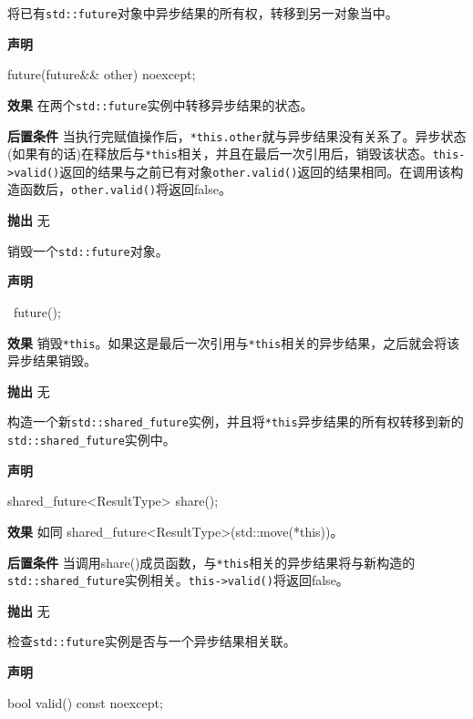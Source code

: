 将已有\texttt{std::future}对象中异步结果的所有权，转移到另一对象当中。

\textbf{声明}

\begin{cpp}
future(future&& other) noexcept;
\end{cpp}

\textbf{效果}
在两个\texttt{std::future}实例中转移异步结果的状态。

\textbf{后置条件}
当执行完赋值操作后，\texttt{*this.other}就与异步结果没有关系了。异步状态(如果有的话)在释放后与\texttt{*this}相关，并且在最后一次引用后，销毁该状态。\texttt{this->valid()}返回的结果与之前已有对象\texttt{other.valid()}返回的结果相同。在调用该构造函数后，\texttt{other.valid()}将返回false。

\textbf{抛出}
无


销毁一个\texttt{std::future}对象。

\textbf{声明}

\begin{cpp}
~future();
\end{cpp}

\textbf{效果}
销毁\texttt{*this}。如果这是最后一次引用与\texttt{*this}相关的异步结果，之后就会将该异步结果销毁。

\textbf{抛出}
无


构造一个新\texttt{std::shared\_future}实例，并且将\texttt{*this}异步结果的所有权转移到新的\texttt{std::shared\_future}实例中。

\textbf{声明}

\begin{cpp}
shared_future<ResultType> share();
\end{cpp}

\textbf{效果}
如同 shared\_future<ResultType>(std::move(*this))。

\textbf{后置条件}
当调用share()成员函数，与\texttt{*this}相关的异步结果将与新构造的\texttt{std::shared\_future}实例相关。\texttt{this->valid()}将返回false。

\textbf{抛出}
无


检查\texttt{std::future}实例是否与一个异步结果相关联。

\textbf{声明}

\begin{cpp}
bool valid() const noexcept;
\end{cpp}

